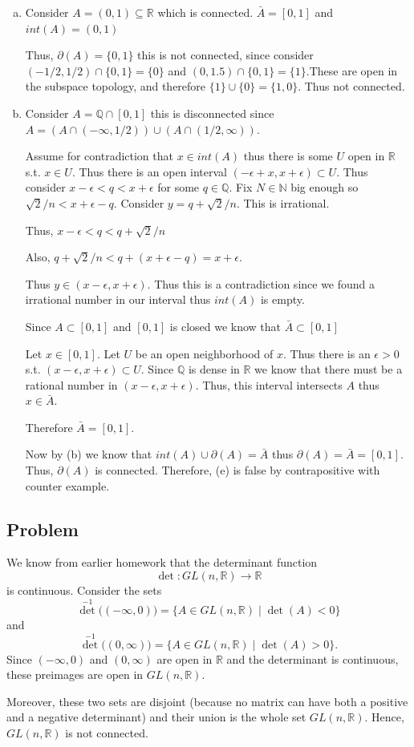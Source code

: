 \documentclass[12pt, letterpaper]{article}
\newcounter{problem}
\newcommand{\q}{
    \newpage %
    \stepcounter{problem} %
    \subsection*{Problem \arabic{problem}} %
}
\newcommand{\R}{\mathbb{R}}
\newcommand{\Q}{\mathbb{Q}}
\newcommand{\N}{\mathbb{N}}
\begin{document}
\begin{enumerate}[(a)]
    \item Consider $A=(0,1) \subseteq \R$ which is connected. $\bar{A}=[0,1]$ and $int(A)=(0,1)$
    
    Thus, $\partial(A)=\{0,1\}$ this is not connected, since consider $(-1/2,1/2) \cap \{0,1\}=\{0\}$ and $(0,1.5) \cap \{0,1\}=\{1\}$.These are open in the subspace topology, and therefore $\{1\} \cup \{0\} = \{1,0\}$. Thus not connected.

    \item Consider $A=\Q \cap [0,1]$ this is disconnected since $A=(A \cap (-\infty,1/2)) \cup (A \cap (1/2, \infty))$.
    
    Assume for contradiction that $x \in int(A)$ thus there is some $U$ open in $\R$ s.t. $x \in U$. Thus there is an open interval $(-\epsilon+x,x+\epsilon) \subset U$. Thus consider $x-\epsilon < q < x+\epsilon$ for some $q \in \Q$. Fix $N \in \N$ big enough so $\sqrt{2}/n < x+\epsilon-q$. Consider $y=q+\sqrt{2}/n$. This is irrational.
    
    Thus, $x-\epsilon < q < q+\sqrt{2}/n$

    Also, $q+\sqrt{2}/n < q + (x+\epsilon - q) = x + \epsilon$.

    Thus $y \in (x-\epsilon, x+\epsilon)$. Thus this is a contradiction since we found a irrational number in our interval thus $int(A)$ is empty.

    Since $A \subset [0,1]$ and $[0,1]$ is closed we know that $\bar{A} \subset [0,1]$

    Let $x \in [0,1]$. Let $U$ be an open neighborhood of $x$. Thus there is an $\epsilon > 0$ s.t. $(x-\epsilon,x+\epsilon) \subset U$. Since $\Q$ is dense in $\R$ we know that there must be a rational number in $(x-\epsilon,x+\epsilon)$. Thus, this interval intersects $A$ thus $x \in \bar{A}$.

    Therefore $\bar{A}=[0,1]$.

    Now by (b) we know that $int(A) \cup \partial(A) = \bar{A}$ thus $\partial(A) = \bar{A}=[0,1]$. Thus, $\partial(A)$ is connected. Therefore, (e) is false by contrapositive with counter example.
\end{enumerate}
\q
We know from earlier homework that the determinant function
\[
\det \colon GL(n,\mathbb{R}) \to \mathbb{R}
\]
is continuous. Consider the sets
\[
\det^{-1}\bigl((-\infty, 0)\bigr) = \{A \in GL(n,\mathbb{R}) \mid \det(A) < 0\}
\]
and
\[
\det^{-1}\bigl((0, \infty)\bigr) = \{A \in GL(n,\mathbb{R}) \mid \det(A) > 0\}.
\]
Since \((-\infty, 0)\) and \((0, \infty)\) are open in \(\mathbb{R}\) and the determinant is continuous, these preimages are open in \(GL(n,\mathbb{R})\).

Moreover, these two sets are disjoint (because no matrix can have both a positive and a negative determinant) and their union is the whole set \(GL(n,\mathbb{R})\). Hence, \(GL(n,\mathbb{R})\) is not connected.
\end{document}
